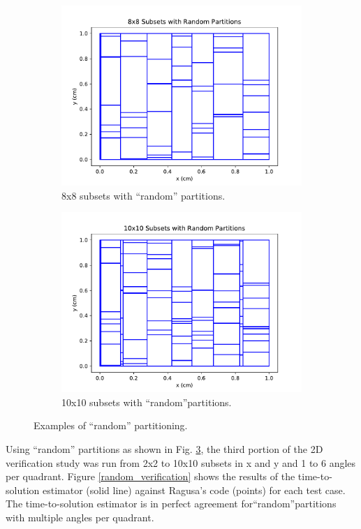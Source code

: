 \begin{figure}[H]
\begin{subfigure}[b]{0.45\textwidth}
  \includegraphics[width=\textwidth]{../cut_line_files/8_random.pdf}
  \caption{8x8 subsets with ``random'' partitions.}
  \label{8random}
\end{subfigure}
\begin{subfigure}[b]{0.45\textwidth}
  \includegraphics[width=\textwidth]{../cut_line_files/10_random.pdf}
  \caption{10x10 subsets with ``random''partitions.}
  \label{10random}
\end{subfigure}
\caption{Examples of ``random'' partitioning.}
\label{random_partitions}
\end{figure}

Using ``random'' partitions as shown in Fig. \ref{random_partitions}, the third portion of the 2D verification study was run from 2x2 to 10x10 subsets in x and y and 1 to 6 angles per quadrant.  Figure \ref{random_verification} shows the results of the time-to-solution estimator (solid line) against Ragusa's code (points) for each test case. The time-to-solution estimator is in perfect agreement for``random''partitions with multiple angles per quadrant.

